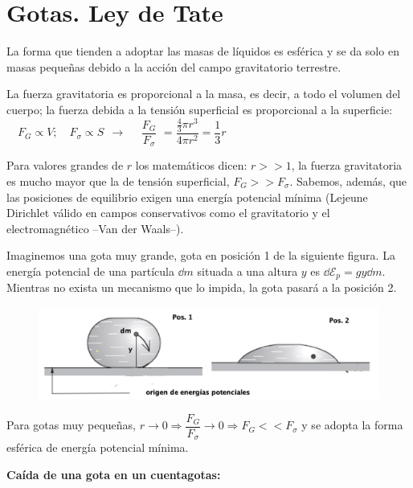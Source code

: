 \section{Gotas. Ley de Tate}

La forma que tienden a adoptar las masas de líquidos es esférica y se da solo en masas pequeñas debido a la acción del campo gravitatorio terrestre.

La fuerza gravitatoria es proporcional a la masa, es decir, a todo el volumen del cuerpo; la fuerza debida a la tensión superficial es proporcional a la superficie: $\quad F_G \propto V;\quad F_{\sigma} \propto S \ \ \to \quad$
$\dfrac{F_G} {F_{\sigma}}$
$=\dfrac{\frac 4 3 \pi r^3}{4 \pi r^2}=\dfrac 1 3 r$

Para valores grandes de $r$ \textcolor{gris}{los matemáticos dicen: $r>>1$}, la fuerza gravitatoria es mucho mayor que la de tensión superficial, $F_G>>F_\sigma$.  Sabemos, además, que las posiciones de equilibrio exigen una energía potencial mínima (Lejeune Dirichlet \textcolor{gris}{ válido en campos conservativos como el gravitatorio y el electromagnético --Van der Waals--}).

Imaginemos una gota muy grande, gota en posición 1 de la siguiente figura. La energía potencial de una partícula $\dd m$ situada a una altura $y$ es $\dd \mathcal E_p=gy\dd m$. Mientras no exista un mecanismo que lo impida, la gota pasará a la posición 2.

\begin{figure}[H]
	\centering
	\includegraphics[width=1\textwidth]{imagenes/imagenes08/T08IM09.png}
\end{figure}


Para gotas muy pequeñas, $r \to 0 \Rightarrow \dfrac {F_G}{F_\sigma} \to 0 \Rightarrow F_G<<F_\sigma$ y se adopta la forma esférica de energía potencial mínima.

\textbf{Caída de una gota en un cuentagotas:}


